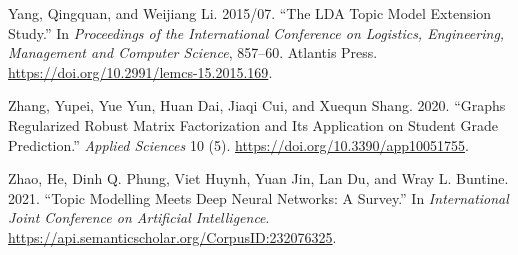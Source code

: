 \documentclass[
]{article}
\newlength{\cslhangindent}
\newlength{\cslentryspacingunit} %
\newenvironment{CSLReferences}[2] %
 {%
  \setlength{\parindent}{0pt}
  \ifodd #1
  \let\oldpar\par
  \def\par{\hangindent=\cslhangindent\oldpar}
  \fi
  \setlength{\parskip}{#2\cslentryspacingunit}
 }%
 {}
\begin{document}
\begin{CSLReferences}{1}{0}
\leavevmode{}%
Yang, Qingquan, and Weijiang Li. 2015/07. {``The LDA Topic Model Extension Study.''} In \emph{Proceedings of the International Conference on Logistics, Engineering, Management and Computer Science}, 857--60. Atlantis Press. \url{https://doi.org/10.2991/lemcs-15.2015.169}.

\leavevmode{}%
Zhang, Yupei, Yue Yun, Huan Dai, Jiaqi Cui, and Xuequn Shang. 2020. {``Graphs Regularized Robust Matrix Factorization and Its Application on Student Grade Prediction.''} \emph{Applied Sciences} 10 (5). \url{https://doi.org/10.3390/app10051755}.

\leavevmode{}%
Zhao, He, Dinh Q. Phung, Viet Huynh, Yuan Jin, Lan Du, and Wray L. Buntine. 2021. {``Topic Modelling Meets Deep Neural Networks: A Survey.''} In \emph{International Joint Conference on Artificial Intelligence}. \url{https://api.semanticscholar.org/CorpusID:232076325}.

\end{CSLReferences}
\end{document}
